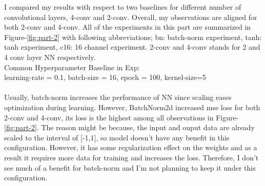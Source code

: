 \documentclass[12pt]{article}
\begin{document}
    \begin{center}
        \raggedright
        I compared my results with respect to two baselines for different number of convolutional layers, 4-conv and 2-conv.
        Overall, my observations are aligned for both 2-conv and 4-conv. All of the experiments in this part are summarized in Figure-\ref*{fig:part-2} with following abbreviations; bn: batch-norm experiment, tanh: tanh experiment, c16: 16 channel experiment. 2-conv and 4-conv stands for 2 and 4 conv layer NN respectively.
        \\
        Common Hyperparameter Baseline in Exp: \\
        learning-rate = 0.1, batch-size = 16, epoch = 100, kernel-size=5
        \\~\\

        Usually, batch-norm increases the performance of NN since scaling eases optimization during learning.
        However, BatchNorm2d increased mse loss for both 2-conv and 4-conv, its loss is the highest among all observations in Figure-\ref*{fig:part-2}.
        The reason might be because, the input and ouput data are already scaled to the interval of [-1,1], so model doesn't have any benefit in this configuration.
        However, it has some regularization effect on the weights and as a result it requires more data for training and increases the loss.
        Therefore, I don't see much of a benefit for batch-norm and I'm not planning to keep it under this configuration.
        \\~\\


\end{center}
\end{document}
